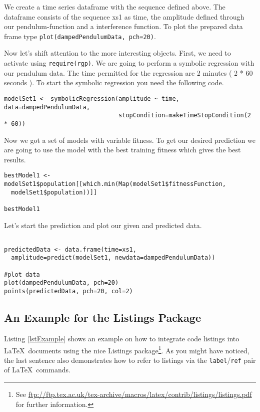 We create a time series dataframe with the sequence defined above. 
The dataframe consists of the sequence xs1 as time, the amplitude defined through our pendulum-function and a
interference function.
To plot the prepared data frame type \lstinline!plot(dampedPendulumData, pch=20)!.

Now let's shift attention to the more interesting objects.
First, we need to activate \RGP using \lstinline!require(rgp)!.
We are going to perform a symbolic regression with our pendulum data.
The time permitted for the regression are 2 minutes ( 2 * 60 seconds ).
To start the symbolic regression you need the following code.

\begin{lstlisting}[caption = {Symbolic Regression }, label = tutsymbolicregression]
modelSet1 <- symbolicRegression(amplitude ~ time, data=dampedPendulumData,
                                stopCondition=makeTimeStopCondition(2 * 60))
\end{lstlisting}

Now we got a set of models with variable fitness. 
To get our desired prediction we are going to use the model with the best training fitness
which gives the best results.

\begin{lstlisting}[caption = {Best Model}, label = tutbestmodel]
bestModel1 <- modelSet1$population[[which.min(Map(modelSet1$fitnessFunction, 
  modelSet1$population))]]

bestModel1
\end{lstlisting}

Let's start the prediction and plot our given and predicted data. 

\begin{lstlisting}[caption = {Prediction}, label = tutPrediction]

predictedData <- data.frame(time=xs1,
  amplitude=predict(modelSet1, newdata=dampedPendulumData))

#plot data
plot(dampedPendulumData, pch=20)
points(predictedData, pch=20, col=2)

\end{lstlisting}



\subsection{An Example for the Listings Package} %
Listing \ref{lstExample} shows an example on how to integrate \R code listings into \LaTeX~documents
using the nice {\sf Listings} package\footnote{See
  \url{ftp://ftp.tex.ac.uk/tex-archive/macros/latex/contrib/listings/listings.pdf} for further
  information.}. As you might have noticed, the last sentence also demonstrates how to refer to
listings via the {\tt label}/{\tt ref} pair of \LaTeX~commands.

